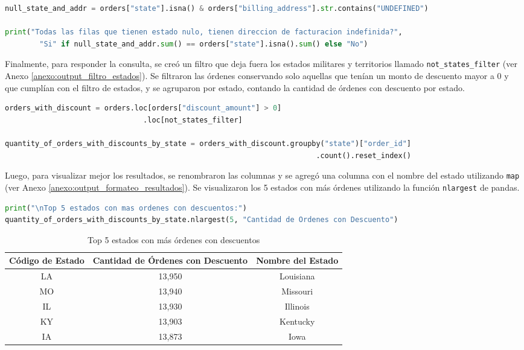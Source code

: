 \begin{lstlisting}[language=Python, xleftmargin=25pt, xrightmargin=25pt, ]
null_state_and_addr = orders["state"].isna() & orders["billing_address"].str.contains("UNDEFINED")

print("Todas las filas que tienen estado nulo, tienen direccion de facturacion indefinida?", 
        "Si" if null_state_and_addr.sum() == orders["state"].isna().sum() else "No")
\end{lstlisting}

Finalmente, para responder la consulta, se creó un filtro que deja fuera los estados militares y territorios llamado \texttt{not\_states\_filter} (ver Anexo \ref{anexo:output_filtro_estados}). Se filtraron las órdenes conservando solo aquellas que tenían un monto de descuento mayor a 0 y que cumplían con el filtro de estados, y se agruparon por estado, contando la cantidad de órdenes con descuento por estado.

\begin{lstlisting}[language=Python, xleftmargin=35pt, xrightmargin=35pt, ]
orders_with_discount = orders.loc[orders["discount_amount"] > 0]
                                .loc[not_states_filter]

quantity_of_orders_with_discounts_by_state = orders_with_discount.groupby("state")["order_id"]
                                                                        .count().reset_index()
\end{lstlisting}

Luego, para visualizar mejor los resultados, se renombraron las columnas y se agregó una columna con el nombre del estado utilizando \texttt{map} (ver Anexo \ref{anexo:output_formateo_resultados}). Se visualizaron los 5 estados con más órdenes utilizando la función \texttt{nlargest} de pandas.

\begin{lstlisting}[language=Python, xleftmargin=35pt, xrightmargin=35pt]
print("\nTop 5 estados con mas ordenes con descuentos:")
quantity_of_orders_with_discounts_by_state.nlargest(5, "Cantidad de Ordenes con Descuento")
\end{lstlisting}
\begin{table}[H]
\centering

\begin{tabular}{|c|c|c|}
\hline
\textbf{Código de Estado} & \textbf{Cantidad de Órdenes con Descuento} & \textbf{Nombre del Estado} \\
\hline
LA & 13,950 & Louisiana \\
MO & 13,940 & Missouri \\
IL & 13,930 & Illinois \\
KY & 13,903 & Kentucky \\
IA & 13,873 & Iowa \\
\hline
\end{tabular}
\caption{Top 5 estados con más órdenes con descuentos}
\end{table}

